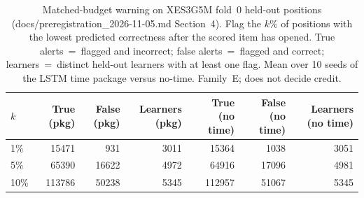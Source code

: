 \begin{table}[tbp]
\caption{Matched-budget warning on XES3G5M fold~0 held-out positions
(docs/preregistration\_2026-11-05.md Section~4). Flag the $k\%$ of
positions with the lowest predicted correctness after the scored item
has opened. True alerts~=~flagged and incorrect; false alerts~=~flagged
and correct; learners~=~distinct held-out learners with at least one
flag. Mean over 10 seeds of the LSTM time package versus no-time.
Family~E; does not decide credit.}
\label{tab:alert-budget}
\centering
\footnotesize
\begin{tabular}{@{}lrrrrrr@{}}
\toprule
$k$ & True (pkg) & False (pkg) & Learners (pkg) & True (no time) & False (no time) & Learners (no time) \\
\midrule
1\% & 15471 & 931 & 3011 & 15364 & 1038 & 3051 \\
5\% & 65390 & 16622 & 4972 & 64916 & 17096 & 4981 \\
10\% & 113786 & 50238 & 5345 & 112957 & 51067 & 5345 \\
\bottomrule
\end{tabular}
\end{table}
